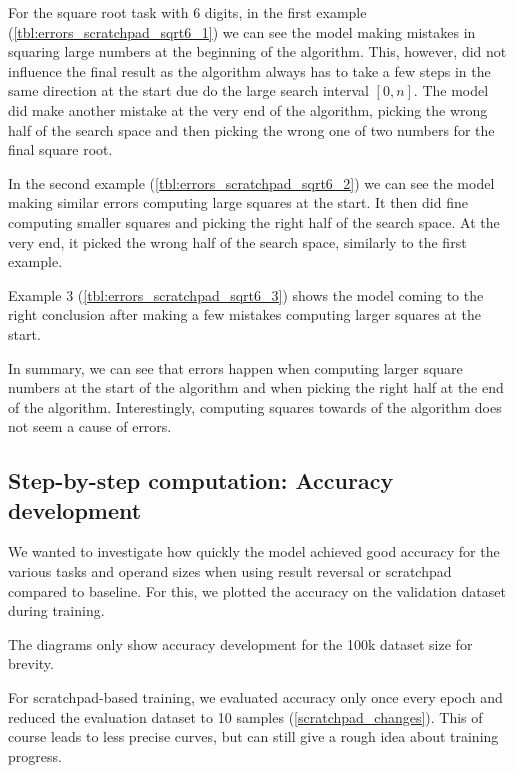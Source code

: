 For the square root task with 6 digits, in the first example (\cref{tbl:errors_scratchpad_sqrt6_1}) we can see the model making mistakes in squaring large numbers at the beginning of the algorithm. This, however, did not influence the final result as the algorithm always has to take a few steps in the same direction at the start due do the large search interval $[0, n]$.
The model did make another mistake at the very end of the algorithm, picking the wrong half of the search space and then picking the wrong one of two numbers for the final square root.

In the second example (\cref{tbl:errors_scratchpad_sqrt6_2}) we can see the model making similar errors computing large squares at the start. It then did fine computing smaller squares and picking the right half of the search space. At the very end, it picked the wrong half of the search space, similarly to the first example.

Example 3 (\cref{tbl:errors_scratchpad_sqrt6_3}) shows the model coming to the right conclusion after making a few mistakes computing larger squares at the start.

In summary, we can see that errors happen when computing larger square numbers at the start of the algorithm and when picking the right half at the end of the algorithm. Interestingly, computing squares towards of the algorithm does not seem a cause of errors.


\subsection{Step-by-step computation: Accuracy development}

We wanted to investigate how quickly the model achieved good accuracy for the various tasks and operand sizes when using result reversal or scratchpad compared to baseline. For this, we plotted the accuracy on the validation dataset during training.

The diagrams only show accuracy development for the 100k dataset size for brevity.

For scratchpad-based training, we evaluated accuracy only once every epoch and reduced the evaluation dataset to 10 samples (\cref{scratchpad_changes}). This of course leads to less precise curves, but can still give a rough idea about training progress.


